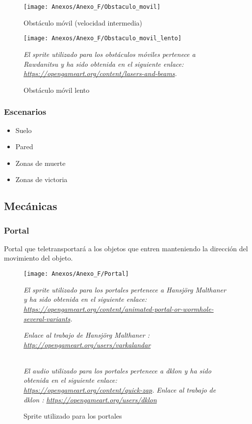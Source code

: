 \begin{figure}[h]
\centering
\texttt{[image: Anexos/Anexo\_F/Obstaculo\_movil]}
\caption{Obstáculo móvil (velocidad intermedia)}
\end{figure}

\begin{figure}[h]
\centering
\texttt{[image: Anexos/Anexo\_F/Obstaculo\_movil\_lento]}
\caption{Obstáculo móvil lento}
\raggedright
\textit{El sprite utilizado para los obstáculos móviles pertenece a Rawdanitsu y ha sido obtenida en el siguiente enlace: \url{https://opengameart.org/content/lasers-and-beams}.}
\end{figure}
\clearpage

\subsubsection{Escenarios}
\begin{itemize}
\item
Suelo
\item
Pared
\item
Zonas de muerte
\item
Zonas de victoria
\end{itemize}

\subsection{Mecánicas}
\subsubsection{Portal}
Portal que teletransportará a los objetos que entren manteniendo la dirección del movimiento del objeto.

\begin{figure}[h]
\centering
\texttt{[image: Anexos/Anexo\_F/Portal]}
\caption{Sprite utilizado para los portales}
\raggedright
\textit{El sprite utilizado para los portales pertenece a Hansjörg Malthaner y ha sido obtenida en el siguiente enlace: \url{https://opengameart.org/content/animated-portal-or-wormhole-several-variants}.}

\textit{Enlace al trabajo de Hansjörg Malthaner : \url{http://opengameart.org/users/varkalandar}}

\textit{\\El audio utilizado para los portales pertenece a dklon y ha sido obtenida en el siguiente enlace: \url{https://opengameart.org/content/quick-zap}.}
\textit{Enlace al trabajo de dklon : \url{https://opengameart.org/users/dklon}}
\end{figure}

